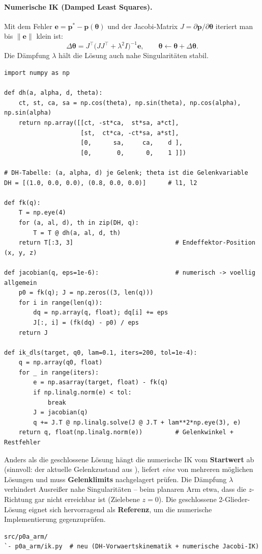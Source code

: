 \paragraph{Numerische IK (Damped Least Squares).} Mit dem Fehler
$\mathbf{e}=\mathbf{p}^\ast-\mathbf{p}(\boldsymbol\theta)$ und der Jacobi-Matrix
$J=\partial\mathbf{p}/\partial\boldsymbol\theta$ iteriert man bis
$\lVert\mathbf{e}\rVert$ klein ist:
\[
\Delta\boldsymbol\theta = J^\top\!\big(JJ^\top+\lambda^2 I\big)^{-1}\mathbf{e},
\qquad \boldsymbol\theta \leftarrow \boldsymbol\theta+\Delta\boldsymbol\theta .
\]
Die Dämpfung $\lambda$ hält die Lösung auch nahe Singularitäten stabil.
\begin{lstlisting}[style=py,caption={\code{ik.py} -- DH-Vorwärtskinematik + numerische IK (skaliert auf N Gelenke)}]
import numpy as np

def dh(a, alpha, d, theta):
    ct, st, ca, sa = np.cos(theta), np.sin(theta), np.cos(alpha), np.sin(alpha)
    return np.array([[ct, -st*ca,  st*sa, a*ct],
                     [st,  ct*ca, -ct*sa, a*st],
                     [0,      sa,     ca,    d ],
                     [0,       0,      0,    1 ]])

# DH-Tabelle: (a, alpha, d) je Gelenk; theta ist die Gelenkvariable
DH = [(1.0, 0.0, 0.0), (0.8, 0.0, 0.0)]      # l1, l2

def fk(q):
    T = np.eye(4)
    for (a, al, d), th in zip(DH, q):
        T = T @ dh(a, al, d, th)
    return T[:3, 3]                            # Endeffektor-Position (x, y, z)

def jacobian(q, eps=1e-6):                     # numerisch -> voellig allgemein
    p0 = fk(q); J = np.zeros((3, len(q)))
    for i in range(len(q)):
        dq = np.array(q, float); dq[i] += eps
        J[:, i] = (fk(dq) - p0) / eps
    return J

def ik_dls(target, q0, lam=0.1, iters=200, tol=1e-4):
    q = np.array(q0, float)
    for _ in range(iters):
        e = np.asarray(target, float) - fk(q)
        if np.linalg.norm(e) < tol:
            break
        J = jacobian(q)
        q += J.T @ np.linalg.solve(J @ J.T + lam**2*np.eye(3), e)
    return q, float(np.linalg.norm(e))         # Gelenkwinkel + Restfehler
\end{lstlisting}

\begin{warnbox}[title=Numerische IK in der Praxis]
Anders als die geschlossene Lösung hängt die numerische IK vom \textbf{Startwert}
ab (sinnvoll: der aktuelle Gelenkzustand aus ), liefert
\emph{eine} von mehreren möglichen Lösungen und muss \textbf{Gelenklimits}
nachgelagert prüfen. Die Dämpfung $\lambda$ verhindert Ausreißer nahe
Singularitäten -- beim planaren Arm etwa, dass die $z$-Richtung gar nicht
erreichbar ist (Zielebene $z=0$). Die geschlossene 2-Glieder-Lösung eignet sich
hervorragend als \textbf{Referenz}, um die numerische Implementierung
gegenzuprüfen.
\end{warnbox}
\begin{lstlisting}[style=bash,caption={\code{ros2\_ws}-Delta nach Schritt 7 (\# neu / \# angepasst)}]
src/p0a_arm/
`- p0a_arm/ik.py  # neu (DH-Vorwaertskinematik + numerische Jacobi-IK)
\end{lstlisting}

